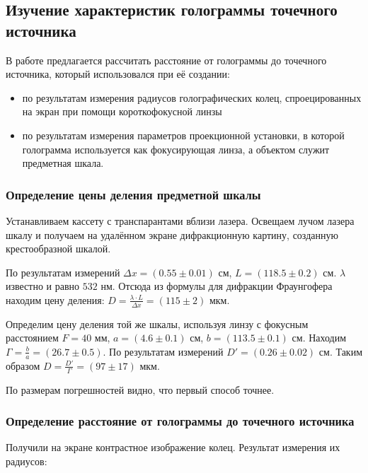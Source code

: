 
\subsection{Изучение характеристик голограммы точечного источника}

    В работе предлагается рассчитать расстояние от голограммы до точечного источника, 
    который использовался при её создании:
    \begin{itemize}
        \item по результатам измерения радиусов голографических колец,
              спроецированных на экран при помощи короткофокусной линзы
        \item по результатам измерения параметров проекционной установки, 
              в которой голограмма используется как фокусирующая линза, 
              а объектом служит предметная шкала.
    \end{itemize}

    \subsubsection*{Определение цены деления предметной шкалы}

        Устанавливаем кассету с транспарантами вблизи лазера. Освещаем лучом лазера шкалу и 
        получаем на удалённом экране дифракционную картину, созданную крестообразной шкалой.

        По результатам измерений $\Delta x = (0.55 \pm 0.01)$ см, $L = (118.5 \pm 0.2)$ см.
        $\lambda$ известно и равно $532$ нм. Отсюда из формулы для дифракции Фраунгофера
        находим цену деления: $D = \frac{\lambda \cdot L}{\Delta x} = (115 \pm 2)$ мкм.

        Определим цену деления той же шкалы, используя линзу с фокусным расстоянием
        $F = 40$ мм, $a = (4.6 \pm 0.1)$ см, $b = (113.5 \pm 0.1)$ см. Находим
        $\Gamma = \frac{b}{a} = (26.7 \pm 0.5)$. По результатам измерений
        $D' = (0.26 \pm 0.02)$ см. Таким образом $D = \frac{D'}{\Gamma} = (97 \pm 17)$ мкм.

        По размерам погрешностей видно, что первый способ точнее.

    \subsubsection*{Определение расстояние от голограммы до точечного источника}

        Получили на экране контрастное изображение колец. Результат измерения их радиусов:

